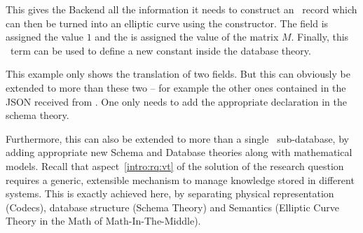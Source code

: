 This gives the Backend all the information it needs to construct an \mmt\ record which can then be turned into an elliptic curve using the  constructor. 
The  field is assigned the value $1$ and the  is assigned the value of the matrix $M$. 
Finally, this \mmt\ term can be used to define a new constant inside the database theory. 

This example only shows the translation of two fields. 
But this can obviously be extended to more than these two -- for example the other ones contained in the JSON received from \lmfdb. 
One only needs to add the appropriate declaration in the schema theory. 

Furthermore, this can also be extended to more than a single \lmfdb\ sub-database, by adding appropriate new Schema and Database theories along with mathematical models. 
Recall that aspect~\ref{intro:rq:vt} of the solution of the research question requires a generic, extensible mechanism to manage knowledge stored in different systems. 
This is exactly achieved here, by separating physical representation (Codecs), database
structure (Schema Theory) and Semantics (Elliptic Curve Theory in the Math of
Math-In-The-Middle). 

